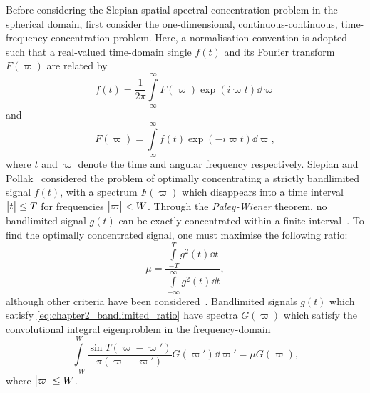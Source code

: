Before considering the Slepian spatial-spectral concentration problem in the spherical domain, first consider the one-dimensional, continuous-continuous, time-frequency concentration problem.
Here, a normalisation convention is adopted such that a real-valued time-domain single \(f(t)\) and its Fourier transform \(F(\varpi)\) are related by
%
\begin{equation}
	f(t)
	= \frac{1}{2\pi} \int\limits_{\infty}^{\infty} F(\varpi) \exp(i\varpi t) \dd{\varpi}
\end{equation}
%
and
%
\begin{equation}
	F(\varpi)
	= \int\limits_{\infty}^{\infty} f(t) \exp(-i\varpi t) \dd{\varpi},
\end{equation}
%
where \(t\) and \(\varpi{}\) denote the time and angular frequency respectively.
Slepian and Pollak~\cite{Slepian1961} considered the problem of optimally concentrating a strictly bandlimited signal \(f(t)\), with a spectrum \(F(\varpi)\) which disappears into a time interval \(\big\lvert t\big\rvert \leq T\) for frequencies \(\big\lvert\varpi\big\rvert < W\).
Through the \emph{Paley-Wiener} theorem, no bandlimited signal \(g(t)\) can be exactly concentrated within a finite interval~\cite{Daubechies1992,Mallat2008}.
To find the optimally concentrated signal, one must maximise the following ratio:
%
\begin{equation}\label{eq:chapter2_bandlimited_ratio}
	\mu
	= \frac{\int\limits_{-T}^{T} g^{2}(t) \dd{t}}{\int\limits_{-\infty}^{\infty} g^{2}(t) \dd{t}},
\end{equation}
%
although other criteria have been considered~\cite{Freeden1997,Riedel1995}.
Bandlimited signals \(g(t)\) which satisfy \cref{eq:chapter2_bandlimited_ratio} have spectra \(G(\varpi)\) which satisfy the convolutional integral eigenproblem in the frequency-domain
%
\begin{equation}
	\int\limits_{-W}^{W} \frac{\sin T(\varpi-\varpi')}{\pi(\varpi-\varpi')} G(\varpi') \dd{\varpi'}
	= \mu G(\varpi),
\end{equation}
%
where \(\big\lvert\varpi\big\rvert \leq W\).

